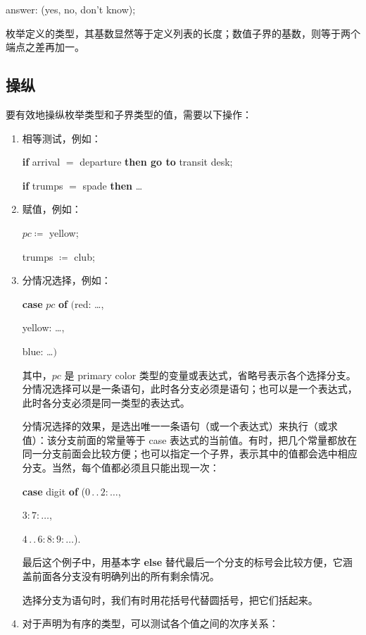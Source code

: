 \quad answer: (yes, no, don't know);

枚举定义的类型，其基数显然等于定义列表的长度；数值子界的基数，则等于两个端点之差再加一。

\subsection{操纵}

要有效地操纵枚举类型和子界类型的值，需要以下操作：

\begin{enumerate}[wide, nosep, label=(\arabic*)]
	\item 相等测试，例如：

	\quad \textbf{if} arrival $=$ departure \textbf{then go to} transit desk;

	\quad \textbf{if} trumps $=$ spade \textbf{then} \dots

	\item 赋值，例如：

	\quad $pc \coloneq$ yellow;

	\quad trumps $\coloneq$ club;

	\item \label{en:manipulation-3}
	分情况选择，例如：

	\quad \textbf{case} $pc$ \textbf{of} $($red: \dots,

	\tabto{5.7em}yellow: \dots,

	\tabto{5.7em}blue: \dots$)$
	
	\noindent
	其中，$pc$ 是 primary color 类型的变量或表达式，省略号表示各个选择分支。分情况选择可以是一条语句，此时各分支必须是语句；也可以是一个表达式，此时各分支必须是同一类型的表达式。
	
	分情况选择的效果，是选出唯一一条语句（或一个表达式）来执行（或求值）：该分支前面的常量等于 case 表达式的当前值。有时，把几个常量都放在同一分支前面会比较方便；也可以指定一个子界，表示其中的值都会选中相应分支。当然，每个值都必须且只能出现一次：
	
	\quad \textbf{case} digit \textbf{of} ($0\,.\,.\,2:\dots$,
	
	\tabto{6.6em}$3:7:\dots$,
	
	\tabto{6.6em}$4\,.\,.\,6:8:9:\dots$).
	
	\noindent
	最后这个例子中，用基本字 \textbf{else} 替代最后一个分支的标号会比较方便，它涵盖前面各分支没有明确列出的所有剩余情况。
	
	选择分支为语句时，我们有时用花括号代替圆括号，把它们括起来。
	
	\item 对于声明为有序的类型，可以测试各个值之间的次序关系：
	

\end{enumerate}
